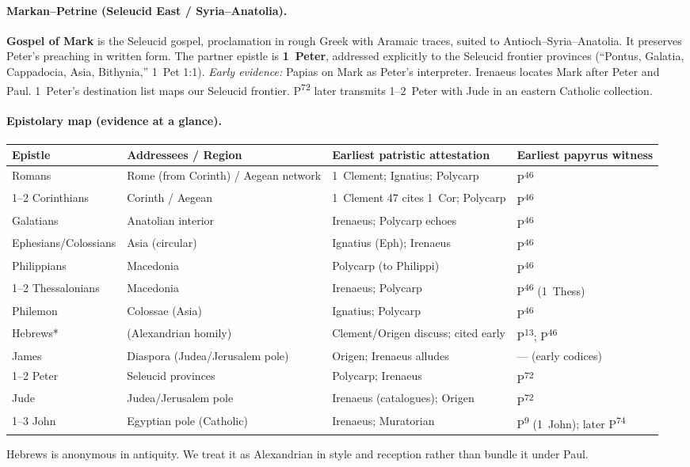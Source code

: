\paragraph{Markan–Petrine (Seleucid East / Syria–Anatolia).}
\textbf{Gospel of Mark} is the Seleucid gospel, proclamation in rough Greek with Aramaic traces, suited to Antioch–Syria–Anatolia.
It preserves Peter’s preaching in written form.
The partner epistle is \textbf{1~Peter}, addressed explicitly to the Seleucid frontier provinces (“Pontus, Galatia, Cappadocia, Asia, Bithynia,” 1~Pet 1:1).
\emph{Early evidence:} Papias on Mark as Peter’s interpreter.
Irenaeus locates Mark after Peter and Paul.
1~Peter’s destination list maps our Seleucid frontier.
P\textsuperscript{72} later transmits 1–2~Peter with Jude in an eastern Catholic collection.

\paragraph{Epistolary map (evidence at a glance).}
\begin{center}
\begin{tabular}{@{}p{3.1cm}p{3.3cm}p{3.8cm}p{4.0cm}@{}}
\toprule
\textbf{Epistle} & \textbf{Addressees / Region} & \textbf{Earliest patristic attestation} & \textbf{Earliest papyrus witness} \\
\midrule
Romans & Rome (from Corinth) / Aegean network & 1~Clement; Ignatius; Polycarp & P\textsuperscript{46} \\
1–2 Corinthians & Corinth / Aegean & 1~Clement 47 cites 1~Cor; Polycarp & P\textsuperscript{46} \\
Galatians & Anatolian interior & Irenaeus; Polycarp echoes & P\textsuperscript{46} \\
Ephesians/Colossians & Asia (circular) & Ignatius (Eph); Irenaeus & P\textsuperscript{46} \\
Philippians & Macedonia & Polycarp (to Philippi) & P\textsuperscript{46} \\
1–2 Thessalonians & Macedonia & Irenaeus; Polycarp & P\textsuperscript{46} (1~Thess) \\
Philemon & Colossae (Asia) & Ignatius; Polycarp & P\textsuperscript{46} \\
Hebrews* & (Alexandrian homily) & Clement/Origen discuss; cited early & P\textsuperscript{13}; P\textsuperscript{46} \\
James & Diaspora (Judea/Jerusalem pole) & Origen; Irenaeus alludes & — (early codices) \\
1–2 Peter & Seleucid provinces & Polycarp; Irenaeus & P\textsuperscript{72} \\
Jude & Judea/Jerusalem pole & Irenaeus (catalogues); Origen & P\textsuperscript{72} \\
1–3 John & Egyptian pole (Catholic) & Irenaeus; Muratorian & P\textsuperscript{9} (1~John); later P\textsuperscript{74} \\
\bottomrule
\end{tabular}
\end{center}
\noindent *Hebrews is anonymous in antiquity.
We treat it as Alexandrian in style and reception rather than bundle it under Paul.

